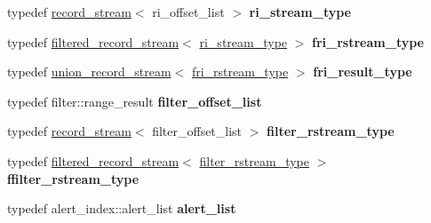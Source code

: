 \begin{DoxyCompactItemize}
\item 
\mbox{\label{classdialog_1_1dialog__table_a86164fbc5fee72cc1a62d179d55b71c6}} 
typedef \hyperlink{classdialog_1_1record__stream}{record\+\_\+stream}$<$ ri\+\_\+offset\+\_\+list $>$ {\bfseries ri\+\_\+stream\+\_\+type}
\item 
\mbox{\label{classdialog_1_1dialog__table_a5205c6bb44ebe5b5de1b82102bc3fcc0}} 
typedef \hyperlink{classdialog_1_1filtered__record__stream}{filtered\+\_\+record\+\_\+stream}$<$ \hyperlink{classdialog_1_1record__stream}{ri\+\_\+stream\+\_\+type} $>$ {\bfseries fri\+\_\+rstream\+\_\+type}
\item 
\mbox{\label{classdialog_1_1dialog__table_a62db48f066dbbb83612443a247063429}} 
typedef \hyperlink{classdialog_1_1union__record__stream}{union\+\_\+record\+\_\+stream}$<$ \hyperlink{classdialog_1_1filtered__record__stream}{fri\+\_\+rstream\+\_\+type} $>$ {\bfseries fri\+\_\+result\+\_\+type}
\item 
\mbox{\label{classdialog_1_1dialog__table_a3a3bb028f66acca9924943c9a93c2229}} 
typedef filter\+::range\+\_\+result {\bfseries filter\+\_\+offset\+\_\+list}
\item 
\mbox{\label{classdialog_1_1dialog__table_aad389a171cfc8c5549a337e28b4af14f}} 
typedef \hyperlink{classdialog_1_1record__stream}{record\+\_\+stream}$<$ filter\+\_\+offset\+\_\+list $>$ {\bfseries filter\+\_\+rstream\+\_\+type}
\item 
\mbox{\label{classdialog_1_1dialog__table_a7f4be410c829a077bfa120231a305a0a}} 
typedef \hyperlink{classdialog_1_1filtered__record__stream}{filtered\+\_\+record\+\_\+stream}$<$ \hyperlink{classdialog_1_1record__stream}{filter\+\_\+rstream\+\_\+type} $>$ {\bfseries ffilter\+\_\+rstream\+\_\+type}
\item 
\mbox{\label{classdialog_1_1dialog__table_aab2700c4a4809067039910376460ad1e}} 
typedef alert\+\_\+index\+::alert\+\_\+list {\bfseries alert\+\_\+list}
\end{DoxyCompactItemize}
